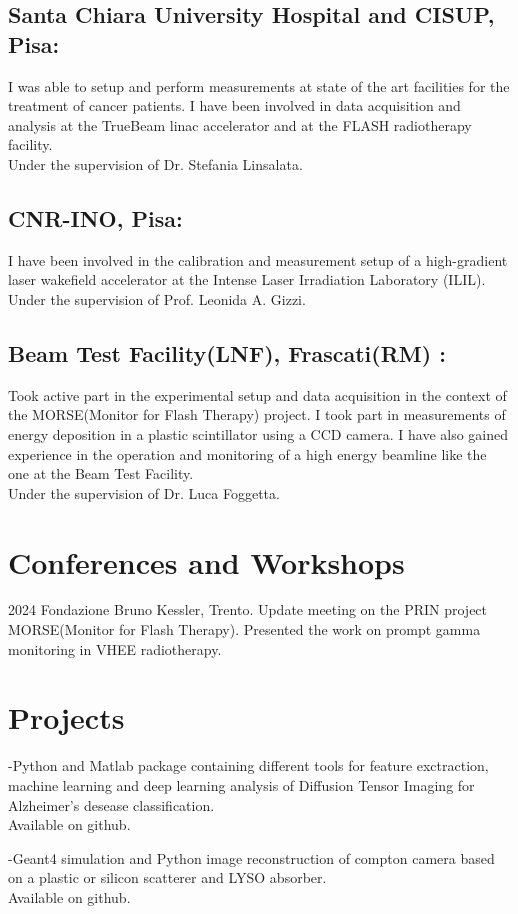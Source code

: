 \documentclass[11pt,letterpaper]{report}
\newcommand{\listitemspace}{0.25em}
\renewenvironment{itemize}
{\begin{list}{}{\setlength{\leftmargin}{0em}
                \setlength{\parskip}{0em}
                \setlength{\itemsep}{\listitemspace}
                \setlength{\parsep}{\listitemspace}}}
{\end{list}}
\begin{document}
    \subsection*{Santa Chiara University Hospital and CISUP, Pisa:}
    I was able to setup and perform measurements at state of the art facilities
    for the treatment of cancer patients. I have been involved in data 
    acquisition and analysis at the TrueBeam linac accelerator and at the
    FLASH radiotherapy facility.\\ Under the supervision of Dr. Stefania Linsalata.
    \subsection*{CNR-INO, Pisa:} I have been involved in the calibration 
    and measurement setup of a high-gradient laser wakefield accelerator at the Intense Laser Irradiation Laboratory (ILIL).
    \\Under the supervision of Prof. Leonida A. Gizzi.
    \subsection*{Beam Test Facility(LNF), Frascati(RM) :}Took active part
    in the experimental setup and data acquisition in the context of the MORSE(Monitor for Flash Therapy)
    project. I took part in measurements of energy deposition in a plastic scintillator
    using a CCD camera. I have also gained experience in the operation and monitoring
    of a high energy beamline like the one at the Beam Test Facility.
    \\Under the supervision of Dr. Luca Foggetta.

    \section*{Conferences and Workshops}
    \begin{tablist}
        \item[2024] \tab{}Fondazione Bruno Kessler, Trento. Update meeting on the PRIN 
        project MORSE(Monitor for Flash Therapy). Presented the work on prompt gamma 
        monitoring in VHEE radiotherapy.

    \end{tablist}


    \section*{Projects}
    \begin{itemize}
        \item -Python and Matlab package containing different tools for feature exctraction, machine learning and deep learning analysis of Diffusion Tensor Imaging for Alzheimer's desease classification. 
         \\Available on github.
        \item -Geant4 simulation and Python image reconstruction of compton camera based on a plastic or silicon 
        scatterer and LYSO absorber. \\Available on github.    
    \end{itemize}
\end{document}
